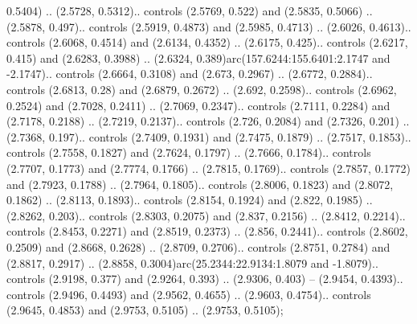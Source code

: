0.5404) .. (2.5728, 0.5312).. controls (2.5769, 0.522) and (2.5835, 0.5066) .. (2.5878, 0.497).. controls (2.5919, 0.4873) and (2.5985, 0.4713) .. (2.6026, 0.4613).. controls (2.6068, 0.4514) and (2.6134, 0.4352) .. (2.6175, 0.425).. controls (2.6217, 0.415) and (2.6283, 0.3988) .. (2.6324, 0.389)arc(157.6244:155.6401:2.1747 and -2.1747).. controls (2.6664, 0.3108) and (2.673, 0.2967) .. (2.6772, 0.2884).. controls (2.6813, 0.28) and (2.6879, 0.2672) .. (2.692, 0.2598).. controls (2.6962, 0.2524) and (2.7028, 0.2411) .. (2.7069, 0.2347).. controls (2.7111, 0.2284) and (2.7178, 0.2188) .. (2.7219, 0.2137).. controls (2.726, 0.2084) and (2.7326, 0.201) .. (2.7368, 0.197).. controls (2.7409, 0.1931) and (2.7475, 0.1879) .. (2.7517, 0.1853).. controls (2.7558, 0.1827) and (2.7624, 0.1797) .. (2.7666, 0.1784).. controls (2.7707, 0.1773) and (2.7774, 0.1766) .. (2.7815, 0.1769).. controls (2.7857, 0.1772) and (2.7923, 0.1788) .. (2.7964, 0.1805).. controls (2.8006, 0.1823) and (2.8072, 0.1862) .. (2.8113, 0.1893).. controls (2.8154, 0.1924) and (2.822, 0.1985) .. (2.8262, 0.203).. controls (2.8303, 0.2075) and (2.837, 0.2156) .. (2.8412, 0.2214).. controls (2.8453, 0.2271) and (2.8519, 0.2373) .. (2.856, 0.2441).. controls (2.8602, 0.2509) and (2.8668, 0.2628) .. (2.8709, 0.2706).. controls (2.8751, 0.2784) and (2.8817, 0.2917) .. (2.8858, 0.3004)arc(25.2344:22.9134:1.8079 and -1.8079).. controls (2.9198, 0.377) and (2.9264, 0.393) .. (2.9306, 0.403) -- (2.9454, 0.4393).. controls (2.9496, 0.4493) and (2.9562, 0.4655) .. (2.9603, 0.4754).. controls (2.9645, 0.4853) and (2.9753, 0.5105) .. (2.9753, 0.5105);



